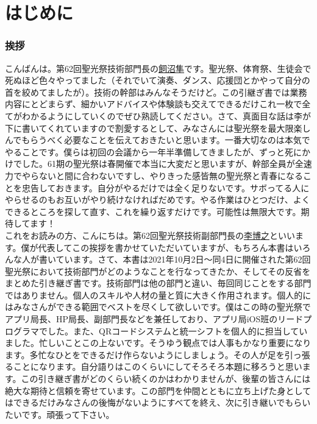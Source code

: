 \documentclass[dvipdfmx,jb5]{jarticle}
\newcommand{\mail}[2]{\href{mailto:#2}{#1}}
\begin{document}
\newpage
\setcounter{tocdepth}{5}
\hypertarget{top}{\tableofcontents}
\newpage

\part{はじめに}
\section{挨拶}
こんばんは。第62回聖光祭技術部門長の\mail{飼沼隼}{60050kainuma@seiko.ac.jp}です。聖光祭、体育祭、生徒会で死ぬほど色々やってました（それでいて演奏、ダンス、応援団とかやって自分の首を絞めてましたが）。技術の幹部はみんなそうだけど。この引継ぎ書では業務内容にとどまらず、細かいアドバイスや体験談も交えてできるだけこれ一枚で全てがわかるようにしていくのでぜひ熟読してください。さて、真面目な話は李が下に書いてくれていますので割愛するとして、みなさんには聖光祭を最大限楽しんでもらうべく必要なことを伝えておきたいと思います。一番大切なのは本気でやることです。僕らは初回の会議から一年半準備してきましたが、ずっと死にかけでした。61期の聖光祭は春開催で本当に大変だと思いますが、幹部全員が全速力でやらないと間に合わないですし、やりきった感皆無の聖光祭と青春になることを忠告しておきます。自分がやるだけでは全く足りないです。サボってる人にやらせるのもお互いがやり続けなければだめです。やる作業はひとつだけ、よくできるところを探して直す、これを繰り返すだけです。可能性は無限大です。期待してます！
\\

これをお読みの方、こんにちは。第62回聖光祭技術副部門長の\mail{李博之}{60227li@seiko.ac.jp}といいます。僕が代表してこの挨拶を書かせていただいていますが、もちろん本書はいろんな人が書いています。さて、本書は2021年10月2日〜同4日に開催された第62回聖光祭において技術部門がどのようなことを行なってきたか、そしてその反省をまとめた引き継ぎ書です。技術部門は他の部門と違い、毎回同じことをする部門ではありません。個人のスキルや人材の量と質に大きく作用されます。個人的にはみなさんができる範囲でベストを尽くして欲しいです。僕はこの時の聖光祭でアプリ局長、HP局長、副部門長などを兼任しており、アプリ局iOS班のリードプログラマでした。また、QRコードシステムと統一シフトを個人的に担当していました。忙しいことこの上ないです。そうゆう観点では人事もかなり重要になります。多忙なひとをできるだけ作らないようにしましょう。その人が足を引っ張ることになります。自分語りはこのくらいにしてそろそろ本題に移ろうと思います。この引き継ぎ書がどのくらい続くのかはわかりませんが、後輩の皆さんには絶大な期待と信頼を寄せています。この部門を仲間とともに立ち上げた身としてはできるだけみなさんの後悔がないようにすべてを終え、次に引き継いでもらいたいです。頑張って下さい。
\end{document}
